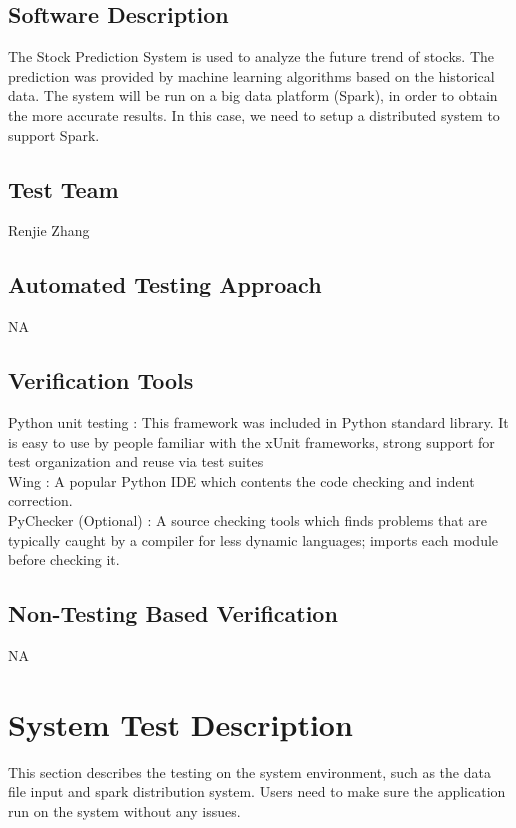 \documentclass[12pt, titlepage]{article}
\begin{document}
\subsection{Software Description}
The Stock Prediction System is used to analyze the future trend of stocks. The prediction was provided by machine learning algorithms based on the historical data. 
The system will be run on a big data platform (Spark), in order to  obtain the more accurate results. In this case, we need to setup a distributed system to support Spark.
\subsection{Test Team}

Renjie Zhang

\subsection{Automated Testing Approach}
NA
\subsection{Verification Tools}
Python unit testing : This framework was included in Python standard library. It is easy to use by people familiar with the xUnit frameworks, strong support for test organization and reuse via test suites\\
Wing : A popular Python IDE which contents the code checking and indent correction.\\
PyChecker (Optional) : A source checking tools which finds problems that are typically caught by a compiler for less dynamic languages; imports each module before checking it.\\



\subsection{Non-Testing Based Verification}
NA

\section{System Test Description}
This section describes the testing on the system environment, such as the data file input and spark distribution system. Users need to make sure the application run on the system without any issues. 
\end{document}
